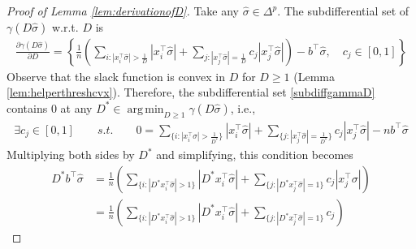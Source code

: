 \documentclass{colt2015} %
\DeclareMathOperator*{\argmin}{arg\,min}
\newcommand{\ifn}{\mathbf{1}} %
\newcommand{\abs}[1]{\left| #1 \right|}
\newcommand{\sighat}{\hat{\sigma}}
\newcommand{\lrp}[1]{\left(#1\right)}
\begin{document}
\begin{proof}[Proof of Lemma \ref{lem:derivationofD}]
Take any $\sighat \in \Delta^p$. 
The subdifferential set of $\gamma (D \sighat)$ w.r.t. $D$ is
\begin{align}
\label{subdiffgammaD}
\frac{\partial \gamma (D \sighat)}{\partial D} 
= \left\{ \frac{1}{n} \lrp{ \sum_{i : \abs{x_{i}^\top \sighat} > \frac{1}{D}} \abs{x_{i}^\top \sighat}  
+ \sum_{j : \abs{x_{j}^\top \sighat} = \frac{1}{D}} c_j \abs{x_{j}^\top \sighat} } - b^\top \sighat , \quad c_j \in [0,1]  \right\}
\end{align}
Observe that the slack function is convex in $D$ for $D \geq 1$ (Lemma \ref{lem:helperthreshcvx}).
Therefore, the subdifferential set \eqref{subdiffgammaD} contains $0$ at any $D^* \in \argmin_{D \geq 1} \gamma (D \sighat)$, 
i.e.,
\begin{align}
\label{gammasgexact}
\exists c_j \in [0,1] \qquad s.t. \qquad 
0 = \sum_{\{i : \abs{x_{i}^\top \sighat} > \frac{1}{D^*} \}} \abs{x_{i}^\top \sighat} 
+ \sum_{\{j : \abs{x_{j}^\top \sighat} = \frac{1}{D^*} \}} c_j \abs{x_{j}^\top \sighat} - n b^\top \sighat
\end{align}
Multiplying both sides by $D^*$ and simplifying, 
this condition becomes 
\begin{align}
\label{eq:valscaledcorr}
D^* b^\top \sighat &= \frac{1}{n} \lrp{ \sum_{\{i : \abs{D^* x_{i}^\top \sighat} > 1 \}} \abs{D^* x_{i}^\top \sighat} 
+ \sum_{\{j : \abs{D^* x_{j}^\top \sighat} = 1 \}} c_j \abs{x_{j}^\top \sigma} } \nonumber \\
&= \frac{1}{n} \lrp{ \sum_{\{i : \abs{D^* x_{i}^\top \sighat} > 1 \}} \abs{D^* x_{i}^\top \sighat} 
+ \sum_{\{j : \abs{D^* x_{j}^\top \sighat} = 1 \}} c_j }
\end{align}



\end{proof}
\end{document}

